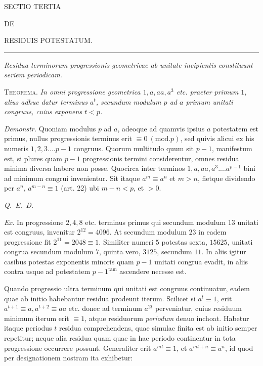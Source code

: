 \begin{center}
{\Large SECTIO TERTIA}\par\bigskip
{\small DE}\par\bigskip
{\Large RESIDUIS POTESTATUM.}
\end{center}

\begin{center}\rule{0.09\linewidth}{0.3pt}\end{center}

\begin{center}\small\emph{Residua terminorum progressionis geometricae ab unitate incipientis constituunt seriem periodicam.}\end{center}


\textsc{Theorema.} \emph{In omni progressione geometrica $1,a,aa,a^3$ etc. praeter primum $1$, alius adhuc datur terminus $a^t$, secundum modulum $p$ ad $a$ primum unitati congruus, cuius exponens $t<p$.}

\emph{Demonstr.} Quoniam modulus $p$ ad $a$, adeoque ad quamvis ipsius $a$ potestatem est primus, nullus progressionis terminus erit $\equiv0\ (\mathrm{mod.}p)$, sed quivis alicui ex his numeris $1,2,3....p-1$ congruus. Quorum multitudo quum sit $p-1$, manifestum est, si plures quam $p-1$ progressionis termini considerentur, omnes residua minima diversa habere non posse. Quocirca inter terminos $1,a,aa,a^3....a^{p-1}$ bini ad minimum congrui invenientur. Sit itaque $a^m\equiv a^n$ et $m>n$, fietque dividendo per $a^n$, $a^{m-n}\equiv1$ (art. 22) ubi $m-n<p$, et $>0$.\par
\noindent\mbox{\emph{Q. E. D.}}

\emph{Ex.} In progressione $2,4,8$ etc. terminus primus qui secundum modulum $13$ unitati est congruus, invenitur $2^{12}=4096$. At secundum modulum $23$ in eadem progressione fit $2^{11}=2048\equiv1$. Similiter numeri $5$ potestas sexta, $15625$, unitati congrua secundum modulum $7$, quinta vero, $3125$, secundum $11$. In aliis igitur casibus potestas exponentis minoris quam $p-1$ unitati congrua evadit, in aliis contra usque ad potestatem $p-1^{\mathrm{tam}}$ ascendere necesse est.


Quando progressio ultra terminum qui unitati est congruus continuatur, eadem quae ab initio habebantur residua prodeunt iterum. Scilicet si $a^t\equiv1$, erit $a^{t+1}\equiv a,a^{t+2}\equiv aa$ etc. donec ad terminum $a^{2t}$ perveniatur, cuius residuum minimum iterum erit $\equiv1$, atque residuorum \emph{periodum} denuo inchoat. Habetur itaque periodus $t$ residua comprehendens, quae simulac finita est ab initio semper repetitur; neque alia residua quam quae in hac periodo continentur in tota progressione occurrere possunt. Generaliter erit $a^{mt}\equiv1$, et $a^{mt+n}\equiv a^n$, id quod per designationem nostram ita exhibetur:

